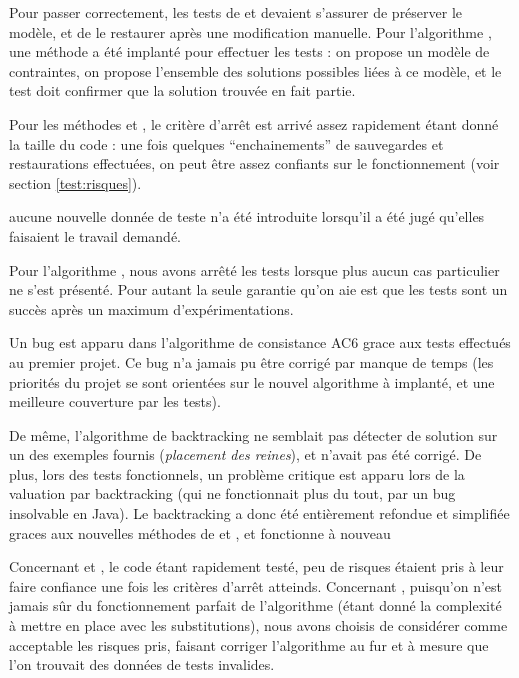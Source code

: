 
Pour passer correctement, les tests de  et  devaient s'assurer de préserver le modèle, et de le restaurer après une modification manuelle.
Pour l'algorithme \fla, une méthode  a été implanté pour effectuer les tests :
on propose un modèle de contraintes, on propose l'ensemble des solutions possibles liées à ce modèle, et le test doit confirmer que la solution trouvée en fait partie.



Pour les méthodes  et , le critère d'arrêt est arrivé assez rapidement étant donné la taille du code : une fois quelques ``enchainements'' de sauvegardes et restaurations effectuées, on peut être assez confiants sur le fonctionnement (voir section \ref{test:risques}).

aucune nouvelle donnée de teste n'a été introduite lorsqu'il a été jugé qu'elles faisaient le travail demandé.

\mk
Pour l'algorithme \fla, nous avons arrêté les tests lorsque plus aucun cas particulier ne s'est présenté.
Pour autant la seule garantie qu'on aie est que les tests sont un succès après un maximum d'expérimentations.



Un bug est apparu dans l'algorithme de consistance AC6 grace aux tests effectués au premier projet.
Ce bug n'a jamais pu être corrigé par manque de temps (les priorités du projet se sont orientées sur le nouvel algorithme à implanté, et une meilleure couverture par les tests).

De même, l'algorithme de backtracking ne semblait pas détecter de solution sur un des exemples fournis (\emph{placement des reines}), et n'avait pas été corrigé.
De plus, lors des tests fonctionnels, un problème critique est apparu lors de la valuation par backtracking (qui ne fonctionnait plus du tout, par un bug insolvable en Java).
Le backtracking a donc été entièrement refondue et simplifiée graces aux nouvelles méthodes de  et , et fonctionne à nouveau


\label{test:risques}

Concernant  et , le code étant rapidement testé, peu de risques étaient pris à leur faire confiance une fois les critères d'arrêt atteinds.
Concernant \fla, puisqu'on n'est jamais sûr du fonctionnement parfait de l'algorithme (étant donné la complexité à mettre en place avec les substitutions), nous avons choisis de considérer comme acceptable les risques pris, faisant corriger l'algorithme au fur et à mesure que l'on trouvait des données de tests invalides.
